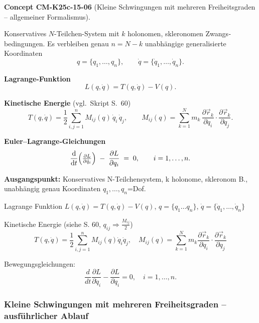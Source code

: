 \documentclass[10pt, letterpaper]{article}
\newcommand{\CustomHeading}[3]{%
  \par\medskip\noindent%
  \textbf{#1 #2} \textnormal{(#3)}.\enskip%
}
\newenvironment{CONC}[2]{\begin{unitbox}\CustomHeading{Concept}{#1}{#2}}{\end{unitbox}}
\begin{document}
\begin{CONC}{CM-K25c-15-06}{Kleine Schwingungen mit mehreren Freiheitsgraden – allgemeiner Formalismus}
Konservatives $N$-Teilchen-System mit $k$ holonomen, skleronomen Zwangs­bedingungen.  
Es verbleiben genau $n=N-k$ unabhängige generalisierte Koordinaten
\[
  q=\{q_1,\dots,q_n\},\qquad 
  \dot q=\{\dot q_1,\dots,\dot q_n\}.
\]

\textbf{Lagrange-Funktion}  
\[
  L(q,\dot q)=T(q,\dot q)-V(q).
\]

\textbf{Kinetische Energie}  (vgl.\ Skript S.~60)  
\[
  T(q,\dot q)=\frac12\sum_{i,j=1}^{n} M_{ij}(q)\,\dot q_i\,\dot q_j,
  \qquad
  M_{ij}(q)=\sum_{k=1}^{N}
            m_k\,
            \frac{\partial\vec r_k}{\partial q_i}\!\cdot\!
            \frac{\partial\vec r_k}{\partial q_j}.
\]

\textbf{Euler–Lagrange‐Gleichungen}  
\[
  \frac{\mathrm d}{\mathrm dt}\Bigl(\tfrac{\partial L}{\partial\dot q_i}\Bigr)
  \;-\;
  \frac{\partial L}{\partial q_i}
  \;=\;0,
  \qquad
  i=1,\dots,n.
\]
\end{CONC}




\noindent\textbf{Ausgangspunkt:} Konservatives N-Teilchensystem, k holonome, skleronom B., unabhängig genau Koordinaten $q_1,\ldots,q_n$=Dof.

Lagrange Funktion $L(q,\dot{q})=T(q,\dot{q})-V(q)$, $q=\{q_1\ldots q_n\}$, $\dot{q}=\{\dot{q}_1,\ldots,\dot{q}_n\}$

Kinetische Energie (siehe S. 60, $q_{ij}\Rightarrow \frac{M_{ij}}{2}$)
\[T(q,\dot{q})=\frac{1}{2}\sum_{i,j=1}^n M_{ij}(q)\dot{q}_i\dot{q}_j, \quad M_{ij}(q)=\sum_{k=1}^N m_k\frac{\partial\vec{r}_k}{\partial q_i}\cdot\frac{\partial\vec{r}_k}{\partial q_j}\]

Bewegungsgleichungen: \[\frac{d}{dt}\frac{\partial L}{\partial\dot{q}_i}-\frac{\partial L}{\partial q_i}=0, \quad i=1,\ldots,n.\]



\subsubsection{Kleine Schwingungen mit mehreren Freiheitsgraden –
                 ausführlicher Ablauf}
\end{document}
